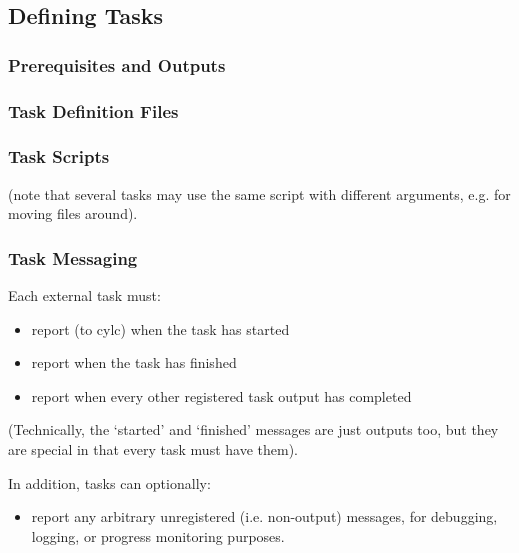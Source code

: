 \documentclass[11pt,a4paper]{article}
\begin{document}
\pagebreak
\label{sec:tasktype}
\subsection{Defining Tasks}

\label{sec:requisites}
\subsubsection{Prerequisites and Outputs}

\label{sec:taskdef}
\subsubsection{Task Definition Files}

\lstset{language=, numbers=left}

{
\color{Brown}

}

\pagebreak
\subsubsection{Task Scripts}

(note that several tasks may use the same script with different
arguments, e.g. for moving files around).

\subsubsection{Task Messaging}

Each external task must:

\begin{itemize}
\item report (to cylc) when the task has started
\item report when the task has finished
\item report when every other registered task output has
completed
\end{itemize}

(Technically, the `started' and `finished' messages are just
outputs too, but they are special in that every task
must have them).

In addition, tasks can optionally:

\begin{itemize}
\item report any arbitrary unregistered (i.e. non-output)
messages, for debugging, logging, or progress monitoring purposes.
\end{itemize}
\end{document}
